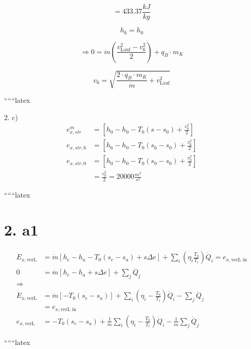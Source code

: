\[
= 433.37 \frac{kJ}{kg}
\]

\[
h_6 = h_0
\]

\[
\Rightarrow 0 = \dot{m} \left( \frac{v_{\text{Lauf}}^2 - v_6^2}{2} \right) + q_B \cdot m_K
\]

\[
v_6 = \sqrt{\frac{2 \cdot q_B \cdot m_K}{\dot{m}} + v_{\text{Lauf}}^2}
\]

``````latex


2. c)
\begin{align*}
    e_{x,str}^m &= \left[ h_0 - h_0 - T_0 (s - s_0) + \frac{v_0^2}{2} \right] \\
    e_{x,str,6} &= \left[ h_6 - h_0 - T_0 (s_6 - s_0) + \frac{v_6^2}{2} \right] \\
    e_{x,str,0} &= \left[ h_0 - h_0 - T_0 (s_0 - s_0) + \frac{v_0^2}{2} \right] \\
    &= \frac{v_0^2}{2} = 20000 \frac{m^2}{s^2}
\end{align*}

``````latex

\section*{2. a1}

\begin{align*}
    \dot{E}_{x,\text{verL}} &= \dot{m} \left[ h_e - h_a - T_0 (s_e - s_a) + s \Delta e \right] + \sum_i \left( \eta_i \frac{T_0}{T_i} \right) \dot{Q}_i = e_{x,\text{verL in}} \\
    0 &= \dot{m} \left[ h_e - h_a + s \Delta e \right] + \sum_j \dot{Q}_j \\
    \Rightarrow \\
    \dot{E}_{x,\text{verL}} &= \dot{m} \left[ - T_0 (s_e - s_a) \right] + \sum_i \left( \eta_i - \frac{T_0}{T_i} \right) \dot{Q}_i - \sum_j \dot{Q}_j \\
    &= e_{x,\text{verL in}} \\
    e_{x,\text{verL}} &= - T_0 (s_e - s_a) + \frac{1}{\dot{m}} \sum_i \left( \eta_i - \frac{T_0}{T_i} \right) \dot{Q}_i - \frac{1}{\dot{m}} \sum_j \dot{Q}_j
\end{align*}

``````latex


